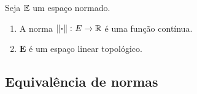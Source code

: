 \begin{proposition}
Seja $\mathbb{E}$ um espaço normado.
	\begin{enumerate}
	\item A norma $\left\Vert{\bm{\cdot}}\right\Vert\colon E \to \mathbb{R}$ é uma função contínua.
	\item $\bm E$ é um espaço linear topológico.
	\end{enumerate}
\end{proposition}
%	

\subsection{Equivalência de normas}




